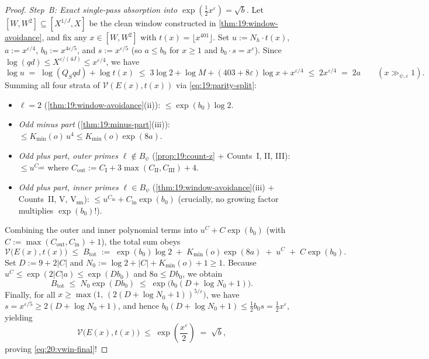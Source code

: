 \begin{proof}
\emph{Step~B: Exact single-pass absorption into $\exp(\frac{1}{2}x^\varepsilon) = \sqrt{b}$.}
Let $[W, W^2] \subseteq [X^{1/J}, X]$ be the clean window constructed in \cref{thm:19:window-avoidance}, and fix any $x \in [W, W^2]$ with $t(x) = \lfloor x^{401}\rfloor$. Set $u := N_h \cdot t(x)$, $a := x^{\varepsilon/4}$, $b_0 := x^{4\varepsilon/5}$, and $s := x^{\varepsilon/5}$ (so $a \le b_0$ for $x \ge 1$ and $b_0 \cdot s = x^\varepsilon$). Since $\log(qd) \le X^{\varepsilon/(4J)} \le x^{\varepsilon/4}$, we have
\[
  \log u \;=\; \log(Q_S q d) + \log t(x)
  \;\le\; 3\log 2 + \log M + (403 + 8\varepsilon)\log x + x^{\varepsilon/4} \;\le\; 2 x^{\varepsilon/4} \;=\; 2 a \qquad (x \gg_{\psi, \varepsilon} 1).
\]
Summing all four strata of $\mathcal{V}(E(x), t(x))$ via \eqref{eq:19:parity-split}:
\begin{itemize}
\item \emph{$\ell = 2$} (\cref{thm:19:window-avoidance}(ii)): $\le \exp(b_0)\log 2$.
\item \emph{Odd minus part} (\cref{thm:19:minus-part}(iii)): $\le K_{\mathrm{min}}(o)\, u^4 \le K_{\mathrm{min}}(o)\exp(8 a)$.
\item \emph{Odd plus part, outer primes $\ell \notin B_\psi$} (\cref{prop:19:count-z} + Counts~I, II, III): $\le u^{C_{\mathrm{out}}}$ where $C_{\mathrm{out}} := C_{\mathrm{I}} + 3\max(C_{\mathrm{II}}, C_{\mathrm{III}}) + 4$.
\item \emph{Odd plus part, inner primes $\ell \in B_\psi$} (\cref{thm:19:window-avoidance}(iii) + Counts~II, V, $\mathrm{V}_{\mathrm{sm}}$): $\le u^{C_{\mathrm{in}}} + C_{\mathrm{in}}\exp(b_0)$ (crucially, no growing factor multiplies $\exp(b_0)$!).
\end{itemize}
Combining the outer and inner polynomial terms into $u^C + C\exp(b_0)$ (with $C := \max(C_{\mathrm{out}}, C_{\mathrm{in}}) + 1$), the total sum obeys
\[
  \mathcal{V}\bigl(E(x), t(x)\bigr)
  \;\le\; B_{\mathrm{tot}}
  \;:=\; \exp(b_0)\log 2 \;+\; K_{\mathrm{min}}(o)\exp(8 a) \;+\; u^C \;+\; C\exp(b_0).
\]
Set $D := 9 + 2|C|$ and $N_0 := \log 2 + |C| + K_{\mathrm{min}}(o) + 1 \ge 1$. Because $u^C \le \exp(2|C| a) \le \exp(D b_0)$ and $8 a \le D b_0$, we obtain
\[
  B_{\mathrm{tot}} \;\le\; N_0 \exp(D b_0) \;\le\; \exp\!\bigl(b_0(D + \log N_0 + 1)\bigr).
\]
Finally, for all $x \ge \max\bigl(1,\, (2(D + \log N_0 + 1))^{5/\varepsilon}\bigr)$, we have $s = x^{\varepsilon/5} \ge 2(D + \log N_0 + 1)$, and hence $b_0(D + \log N_0 + 1) \le \frac{1}{2} b_0 s = \frac{1}{2} x^\varepsilon$, yielding
\[
  \mathcal{V}\bigl(E(x), t(x)\bigr) \;\le\; \exp\!\left(\frac{x^\varepsilon}{2}\right) \;=\; \sqrt{b},
\]
proving \eqref{eq:20:vwin-final}!
\end{proof}


